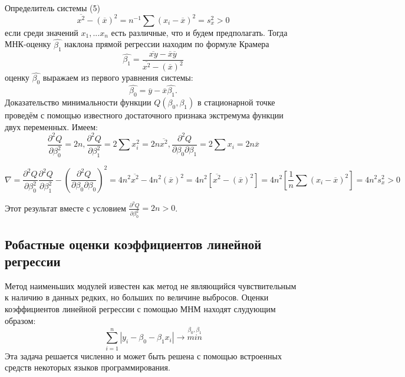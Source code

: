 Определитель системы (5)
\begin{equation} \label{eq:systen}
 \overline{x^2} - (\overline{x})^2 = n^{-1} \sum (x_i - \overline{x})^2 = s^2_x > 0 
\end{equation}
если среди значений $x_1, ... x_n$ есть различные, что и будем предполагать. Тогда МНК-оценку $\hat{\beta_1}$ наклона прямой регрессии находим по формуле Крамера
\begin{equation} \label{eq:systen}
 \hat{\beta_1} =  \frac{\overline{xy} - \overline{x} \overline{y}}{\overline{x^2} - (\overline{x})^2}
\end{equation}
оценку $\hat{\beta_0}$ выражаем из первого уравнения системы:
\begin{equation} \label{eq:systen}
 \hat{\beta_0} =  \overline{y} - \overline{x} \hat{\beta_1}.
\end{equation}
Доказательство минимальности функции $Q(\beta_0, \beta_1)$ в стационарной точке проведём с помощью известного достаточного признака экстремума функции двух переменных. Имеем:
\begin{equation} \label{eq:systen}
\frac{\partial^2 Q}{\partial \beta^2_0} = 2n,
\frac{\partial^2 Q}{\partial \beta^2_1} = 2 \sum x^2_i = 2n\overline{x^2},  
\frac{\partial^2 Q}{\partial \beta_0 \partial \beta_1} = 2 \sum x_i = 2n\overline{x}
\end{equation}


\begin{equation} \label{eq:systen}
  \nabla = \frac{\partial^2 Q}{\partial \beta^2_0} \frac{\partial^2 Q}{\partial \beta^2_1} - (\frac{\partial^2 Q}{\partial \beta_0 \partial \beta_0})^2 
 = 4n^2 \overline{x^2} - 4n^2 (\overline{x})^2 
 = 4n^2 [ \overline{x^2} -  (\overline{x})^2]
 = 4n^2 [ \frac{1}{n} \sum (x_i -\overline{x})^2] = 4n^2s^2_x > 0
\end{equation}

Этот результат вместе с условием $\frac{\partial^2 Q}{\partial \beta^2_0} = 2n > 0$. \cite{theory}


\subsection{Робастные оценки коэффициентов линейной регрессии}
Метод наименьших модулей известен как метод не являющийся чувствительным к наличию в данных редких, но больших по величине выбросов. Оценки коэффициентов линейной регрессии с помощью МНМ находят слудующим образом:
\begin{equation} \label{eq:systen}
  \sum\limits_{i=1}^n |y_i - \beta_0 - \beta_1x_i| \rightarrow  \stackrel{\beta_0, \beta_1}{min}
\end{equation}
Эта задача решается численно и может быть решена с помощью встроенных средств некоторых языков программирования.


